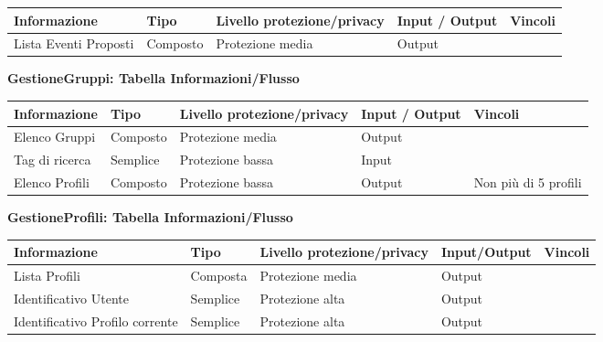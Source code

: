 \begin{tabular} {|P{3cm}|P{3cm}|P{3cm}|P{3cm}|P{3cm}|}
    \hline
    \textbf{Informazione} & \textbf{Tipo} & \textbf{Livello protezione/privacy} & \textbf{Input / Output} & \textbf{Vincoli} \\
    \hline
    Lista Eventi Proposti & Composto      & Protezione media                    & Output                  &                  \\
    \hline
\end{tabular}
\hfill \break

\textbf{GestioneGruppi: Tabella Informazioni/Flusso}
\hfill \break

\begin{tabular} {|P{3cm}|P{3cm}|P{3cm}|P{3cm}|P{3cm}|}
    \hline
    \textbf{Informazione} & \textbf{Tipo} & \textbf{Livello protezione/privacy} & \textbf{Input / Output} & \textbf{Vincoli}     \\
    \hline
    Elenco Gruppi         & Composto      & Protezione media                    & Output                  &                      \\
    \hline
    Tag di ricerca        & Semplice      & Protezione bassa                    & Input                   &                      \\
    \hline
    Elenco Profili        & Composto      & Protezione bassa                    & Output                  & Non più di 5 profili \\
    \hline
\end{tabular}
\hfill \break

\textbf{GestioneProfili: Tabella Informazioni/Flusso}
\hfill \break

\begin{tabular} {|P{3cm}|P{3cm}|P{3cm}|P{3cm}|P{3cm}|}
    \hline
    \textbf{Informazione}           & \textbf{Tipo} & \textbf{Livello protezione/privacy} & \textbf{Input/Output} & \textbf{Vincoli} \\
    \hline
    Lista Profili                   & Composta      & Protezione media                    & Output                &                  \\
    \hline
    Identificativo Utente           & Semplice      & Protezione alta                     & Output                &                  \\
    \hline
    Identificativo Profilo corrente & Semplice      & Protezione alta                     & Output                &                  \\
    \hline
\end{tabular}
\hfill \break

